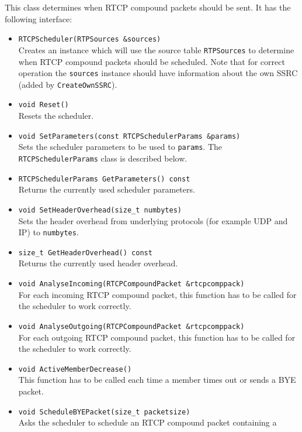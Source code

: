\documentclass[12pt,a4paper]{article}
\begin{document}
				This class determines when RTCP compound packets should be sent. It has
				the following interface:
				\begin{itemize}
					\item {\tt RTCPScheduler(RTPSources \&sources)}\\
						Creates an instance which will use the source table {\tt RTPSources} to
						determine when RTCP compound packets should be scheduled. Note that
						for correct operation the {\tt sources} instance should have information
						about the own SSRC (added by {\tt CreateOwnSSRC}).
					\item {\tt void Reset()}\\
						Resets the scheduler.
					\item {\tt void SetParameters(const RTCPSchedulerParams \&params)}\\
						Sets the scheduler parameters to be used to {\tt params}. The
						{\tt RTCPSchedulerParams} class is described below.
					\item {\tt RTCPSchedulerParams GetParameters() const}\\
						Returns the currently used scheduler parameters.
					\item {\tt void SetHeaderOverhead(size\_t numbytes)}\\
						Sets the header overhead from underlying protocols (for example UDP and
						IP) to {\tt numbytes}.
					\item {\tt size\_t GetHeaderOverhead() const}\\
						Returns the currently used header overhead.
					\item {\tt void AnalyseIncoming(RTCPCompoundPacket \&rtcpcomppack)}\\
						For each incoming RTCP compound packet, this function has to be
						called for the scheduler to work correctly.
					\item {\tt void AnalyseOutgoing(RTCPCompoundPacket \&rtcpcomppack)}\\
						For each outgoing RTCP compound packet, this function has to be
						called for the scheduler to work correctly.
					\item {\tt void ActiveMemberDecrease()}\\
						This function has to be called each time a member times out or
						sends a BYE packet.
					\item {\tt void ScheduleBYEPacket(size\_t packetsize)}\\
						Asks the scheduler to schedule an RTCP compound packet containing a

\end{itemize}
\end{document}
